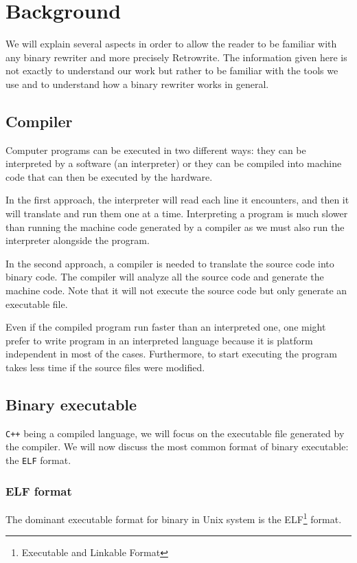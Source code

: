 \documentclass[a4paper,11pt,oneside]{report}
\newcommand{\sysname}{Retrowrite\xspace}
\begin{document}
\chapter{Background}
We will explain several aspects in order to allow the reader to be familiar
with any binary rewriter and more precisely \sysname. The information given
here is not exactly to understand our work but rather to be familiar with the
tools we use and to understand how a binary rewriter works in general.


\section{Compiler}
Computer programs can be executed in two different ways: they can be interpreted
by a software (an interpreter) or they can be compiled into machine code that can
then be executed by the hardware. 


In the first approach, the interpreter will read each line it encounters, and
then it will translate and run them one at a time. Interpreting a program
is much slower than running the machine code generated by a compiler as we must
also run the interpreter alongside the program.

In the second approach, a compiler is needed to translate the source code into
binary code.
The compiler will analyze all the source code and generate the machine code.
Note that it will not execute the source code but only generate an executable
file.


Even if the compiled program run faster than an interpreted one, one might
prefer to write program in an interpreted language because it is platform
independent in most of the cases. Furthermore, to start executing the program
takes less time if the source files were modified.



\section{Binary executable}
\texttt{C++} being a compiled language, we will focus on the executable file
generated by the compiler. We will now discuss the most common format of binary
executable: the \texttt{ELF} format.
\subsection{ELF format}
%
The dominant executable format for binary in Unix system is the
ELF\footnote{Executable and Linkable Format} format. 
\end{document}
